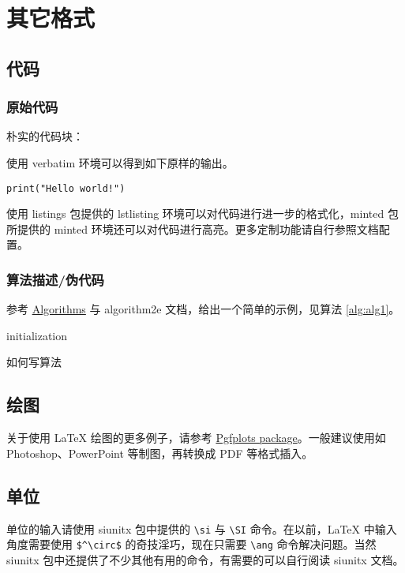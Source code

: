 
\chapter{其它格式}
\section{代码}
\subsection{原始代码}
朴实的代码块：

使用 verbatim 环境可以得到如下原样的输出。
\begin{verbatim}
print("Hello world!")
\end{verbatim}

使用 listings 包提供的 lstlisting 环境可以对代码进行进一步的格式化，minted 包所提供的 minted 环境还可以对代码进行高亮。更多定制功能请自行参照文档配置。

\subsection{算法描述/伪代码}
参考 \href{https://en.wikibooks.org/wiki/LaTeX/Algorithms}{Algorithms} 与 algorithm2e 文档，给出一个简单的示例，见算法 \ref{alg:alg1}。

\begin{algorithm}
  \SetAlgoLined
  initialization\;
  \caption{如何写算法}\label{alg:alg1}
\end{algorithm}

\section{绘图}
关于使用 \LaTeX{} 绘图的更多例子，请参考 \href{https://www.overleaf.com/learn/latex/Pgfplots_package}{Pgfplots package}。一般建议使用如 Photoshop、PowerPoint 等制图，再转换成 PDF 等格式插入。

\section{单位}
单位的输入请使用 siunitx 包中提供的 \verb|\si| 与 \verb|\SI| 命令。在以前，\LaTeX{} 中输入角度需要使用 \verb|$^\circ$| 的奇技淫巧，现在只需要 \verb|\ang| 命令解决问题。当然 siunitx 包中还提供了不少其他有用的命令，有需要的可以自行阅读 siunitx 文档。

